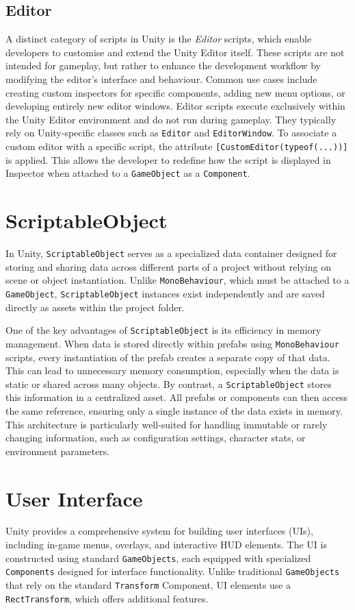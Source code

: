 \subsection{Editor}
A distinct category of scripts in Unity is the \textit{Editor} scripts, which enable developers to customise and extend the Unity Editor itself. These scripts are not intended for gameplay, but rather to enhance the development workflow by modifying the editor’s interface and behaviour. Common use cases include creating custom inspectors for specific components, adding new menu options, or developing entirely new editor windows. Editor scripts execute exclusively within the Unity Editor environment and do not run during gameplay. They typically rely on Unity-specific classes such as \verb|Editor| and \verb|EditorWindow|. To associate a custom editor with a specific script, the attribute \verb|[CustomEditor(typeof(...))]| is applied. This allows the developer to redefine how the script is displayed in Inspector when attached to a \verb|GameObject| as a \verb|Component|.


 \section{ScriptableObject}
In Unity, \verb|ScriptableObject| serves as a specialized data container designed for storing and sharing data across different parts of a project without relying on scene or object instantiation. Unlike \verb|MonoBehaviour|, which must be attached to a \verb|GameObject|, \verb|ScriptableObject| instances exist independently and are saved directly as assets within the project folder.

One of the key advantages of \verb|ScriptableObject| is its efficiency in memory management. When data is stored directly within prefabs using \verb|MonoBehaviour| scripts, every instantiation of the prefab creates a separate copy of that data. This can lead to unnecessary memory consumption, especially when the data is static or shared across many objects. By contrast, a \verb|ScriptableObject| stores this information in a centralized asset. All prefabs or components can then access the same reference, ensuring only a single instance of the data exists in memory. This architecture is particularly well-suited for handling immutable or rarely changing information, such as configuration settings, character stats, or environment parameters.

\section{User Interface}
Unity provides a comprehensive system for building user interfaces (UIs), including in-game menus, overlays, and interactive HUD elements. The UI is constructed using standard \verb|GameObjects|, each equipped with specialized \verb|Components| designed for interface functionality. Unlike traditional \verb|GameObjects| that rely on the standard \verb|Transform| Component, UI elements use a \verb|RectTransform|, which offers additional features.

